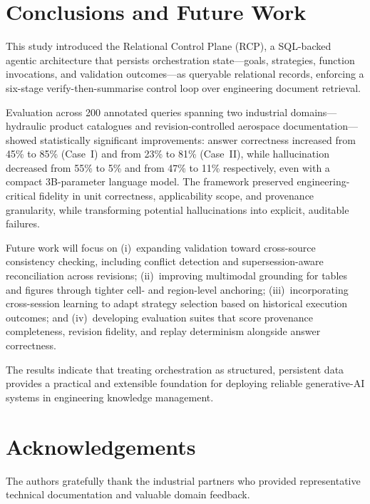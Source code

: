 \documentclass[largeformat]{interact}
\begin{document}
\section{Conclusions and Future Work}
\label{sec:conclusions_and_future_work}
This study introduced the Relational Control Plane (RCP), a SQL-backed agentic architecture that persists orchestration state---goals, strategies, function invocations, and validation outcomes---as queryable relational records, enforcing a six-stage verify-then-summarise control loop over engineering document retrieval.

Evaluation across 200 annotated queries spanning two industrial domains---hydraulic product catalogues and revision-controlled aerospace documentation---showed statistically significant improvements: answer correctness increased from 45\% to 85\% (Case~I) and from 23\% to 81\% (Case~II), while hallucination decreased from 55\% to 5\% and from 47\% to 11\% respectively, even with a compact 3B-parameter language model. The framework preserved engineering-critical fidelity in unit correctness, applicability scope, and provenance granularity, while transforming potential hallucinations into explicit, auditable failures.

Future work will focus on (i)~expanding validation toward cross-source consistency checking, including conflict detection and supersession-aware reconciliation across revisions; (ii)~improving multimodal grounding for tables and figures through tighter cell- and region-level anchoring; (iii)~incorporating cross-session learning to adapt strategy selection based on historical execution outcomes; and (iv)~developing evaluation suites that score provenance completeness, revision fidelity, and replay determinism alongside answer correctness.

The results indicate that treating orchestration as structured, persistent data provides a practical and extensible foundation for deploying reliable generative-AI systems in engineering knowledge management.


\section*{Acknowledgements}
The authors gratefully thank the industrial partners who provided representative technical documentation and valuable domain feedback.
\end{document}
